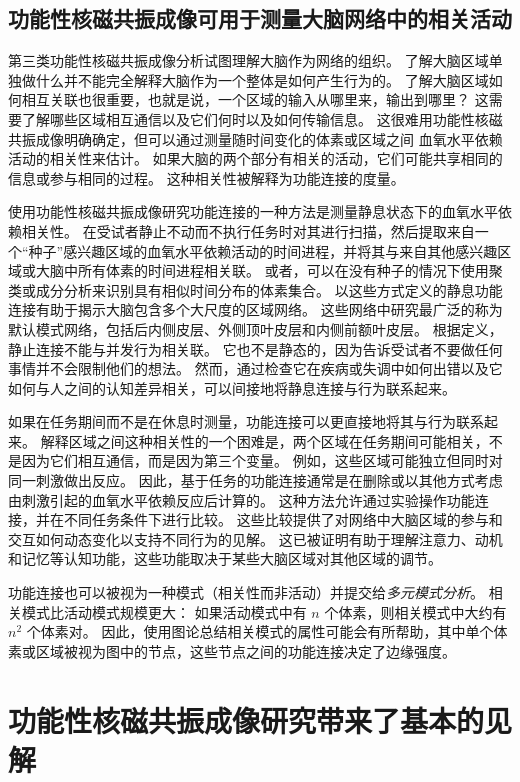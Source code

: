 \subsection{功能性核磁共振成像可用于测量大脑网络中的相关活动}

第三类功能性核磁共振成像分析试图理解大脑作为网络的组织。
了解大脑区域单独做什么并不能完全解释大脑作为一个整体是如何产生行为的。
了解大脑区域如何相互关联也很重要，也就是说，一个区域的输入从哪里来，输出到哪里？
这需要了解哪些区域相互通信以及它们何时以及如何传输信息。
这很难用功能性核磁共振成像明确确定，但可以通过测量随时间变化的体素或区域之间 血氧水平依赖活动的相关性来估计。
如果大脑的两个部分有相关的活动，它们可能共享相同的信息或参与相同的过程。
这种相关性被解释为功能连接的度量。


使用功能性核磁共振成像研究功能连接的一种方法是测量静息状态下的血氧水平依赖相关性。 
在受试者静止不动而不执行任务时对其进行扫描，然后提取来自一个“种子”感兴趣区域的血氧水平依赖活动的时间进程，并将其与来自其他感兴趣区域或大脑中所有体素的时间进程相关联。
或者，可以在没有种子的情况下使用聚类或成分分析来识别具有相似时间分布的体素集合。
以这些方式定义的静息功能连接有助于揭示大脑包含多个大尺度的区域网络。
这些网络中研究最广泛的称为默认模式网络，包括后内侧皮层、外侧顶叶皮层和内侧前额叶皮层。
根据定义，静止连接不能与并发行为相关联。
它也不是静态的，因为告诉受试者不要做任何事情并不会限制他们的想法。
然而，通过检查它在疾病或失调中如何出错以及它如何与人之间的认知差异相关，可以间接地将静息连接与行为联系起来。


如果在任务期间而不是在休息时测量，功能连接可以更直接地将其与行为联系起来。 
解释区域之间这种相关性的一个困难是，两个区域在任务期间可能相关，不是因为它们相互通信，而是因为第三个变量。
例如，这些区域可能独立但同时对同一刺激做出反应。
因此，基于任务的功能连接通常是在删除或以其他方式考虑由刺激引起的血氧水平依赖反应后计算的。 
这种方法允许通过实验操作功能连接，并在不同任务条件下进行比较。
这些比较提供了对网络中大脑区域的参与和交互如何动态变化以支持不同行为的见解。
这已被证明有助于理解注意力、动机和记忆等认知功能，这些功能取决于某些大脑区域对其他区域的调节。


功能连接也可以被视为一种模式（相关性而非活动）并提交给\textit{多元模式分析}。 
相关模式比活动模式规模更大：
如果活动模式中有 $n$ 个体素，则相关模式中大约有 $n^2$ 个体素对。
因此，使用图论总结相关模式的属性可能会有所帮助，其中单个体素或区域被视为图中的节点，这些节点之间的功能连接决定了边缘强度。



\section{功能性核磁共振成像研究带来了基本的见解}

